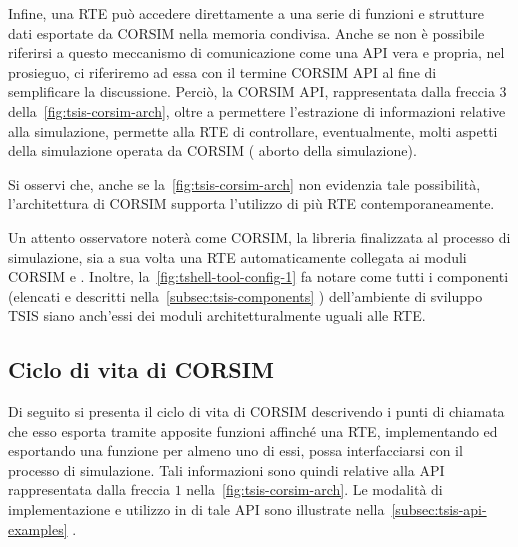Infine, una \acs{RTE} può accedere direttamente a una serie di funzioni e strutture dati esportate da \acs{CORSIM} nella memoria condivisa. Anche se non è possibile riferirsi a questo meccanismo di comunicazione come una \acs{API} vera e propria, nel prosieguo, ci riferiremo ad essa con il termine \acs{CORSIM} \acs{API} al fine di semplificare la discussione. Perciò, la \acs{CORSIM} \acs{API}, rappresentata dalla freccia $3$ della~\vref{fig:tsis-corsim-arch}, oltre a permettere l'estrazione di informazioni relative alla simulazione, permette alla \acs{RTE} di controllare, eventualmente, molti aspetti della simulazione operata da \acs{CORSIM} (\eg{} aborto della simulazione).

Si osservi che, anche se la~\vref{fig:tsis-corsim-arch} non evidenzia tale possibilità, l'architettura di \acs{CORSIM} supporta l'utilizzo di più \acs{RTE} contemporaneamente.

\begin{nota}
Un attento osservatore noterà come \acs{CORSIM}, la libreria finalizzata al processo di simulazione, sia a sua volta una \acs{RTE} automaticamente collegata ai moduli \acs{CORSIM}  e . Inoltre, la~\vref{fig:tshell-tool-config-1} fa notare come tutti i componenti (elencati e descritti nella~\autoref{subsec:tsis-components} ) dell'ambiente di sviluppo \acs{TSIS} siano anch'essi dei moduli architetturalmente uguali alle \acs{RTE}.
\end{nota}

\subsection{Ciclo di vita di CORSIM}\label{subsec:corsim-lifecycle}
Di seguito si presenta il ciclo di vita di \acs{CORSIM} descrivendo i punti di chiamata che esso esporta tramite apposite funzioni affinché una \acs{RTE}, implementando ed esportando una funzione per almeno uno di essi, possa interfacciarsi con il processo di simulazione. Tali informazioni sono quindi relative alla \acs{API} rappresentata dalla freccia $1$ nella~\vref{fig:tsis-corsim-arch}. Le modalità di implementazione e utilizzo in \CC{} di tale \acs{API} sono illustrate nella~\autoref{subsec:tsis-api-examples} .

